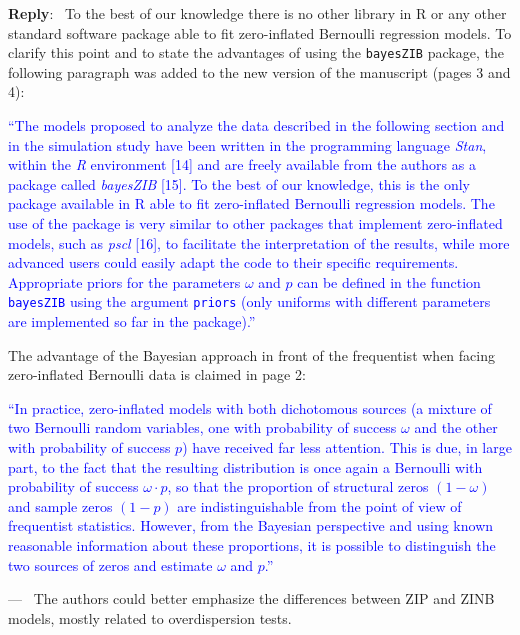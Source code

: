 \documentclass[11pt]{article}
\newcounter{reviewer}
\newcounter{point}[reviewer]
\renewcommand{\thepoint}{C\,\arabic{point}}
\newenvironment{point}
   {\refstepcounter{point} \bigskip \noindent {\textbf{Reviewer~Comment~\thepoint} } ---\ }
   {\par }
\newenvironment{reply}
   {\medskip \noindent \begin{sf}\textbf{Reply}:\  }
   {\medskip \end{sf}}
\begin{document}
\begin{reply}
To the best of our knowledge there is no other library in R or any other standard software package able to fit zero-inflated Bernoulli regression models. To clarify this point and to state the advantages of using the \texttt{bayesZIB} package, the following paragraph was added to the new version of the manuscript (pages 3 and 4):

\textcolor{blue}{``The models proposed to analyze the data described in the following section and in the simulation study have been written in the programming language \textit{Stan}, within the \textit{R} environment [14] and are freely available from the authors as a package called \textit{bayesZIB} [15]. To the best of our knowledge, this is the only package available in R able to fit zero-inflated Bernoulli regression models. The use of the package is very similar to other packages that implement zero-inflated models, such as \textit{pscl} [16], to facilitate the interpretation of the results, while more advanced users could easily adapt the code to their specific requirements. Appropriate priors for the parameters $\omega$ and $p$ can be defined in the function \texttt{bayesZIB} using the argument \texttt{priors} (only uniforms with different parameters are implemented so far in the package).''}

The advantage of the Bayesian approach in front of the frequentist when facing zero-inflated Bernoulli data is claimed in page 2:

\textcolor{blue}{``In practice, zero-inflated models with both dichotomous sources (a mixture of two Bernoulli random variables, one with probability of success $\omega$ and the other with probability of success $p$) have received far less attention. This is due, in large part, to the fact that the resulting distribution is once again a Bernoulli with probability of success $\omega \cdot p$, so that the proportion of structural zeros $(1 - \omega)$ and sample zeros $(1- p)$ are indistinguishable from the point of view of frequentist statistics. However, from the Bayesian perspective and using known reasonable information about these proportions, it is possible to distinguish the two sources of zeros and estimate $\omega$ and $p$.''}

\end{reply}

\begin{point}
The authors could better emphasize the differences between ZIP and ZINB models, mostly related to overdispersion tests.
	\label{pt:C10}
\end{point}
\end{document}
